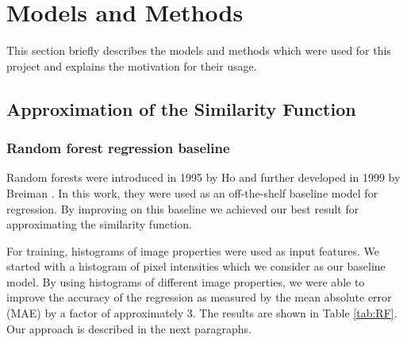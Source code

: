 \documentclass[10pt,conference,compsocconf]{IEEEtran}
\begin{document}


\section{Models and Methods} \label{sec:models_methods}
This section briefly describes the models and methods which were used for this project and explains the motivation for their usage. 

\subsection{Approximation of the Similarity Function}

\subsubsection{Random forest regression baseline} 
Random forests were introduced in 1995 by Ho \cite{Ho} and further developed in 1999 by Breiman \cite{Breiman}. In this work, they were used as an off-the-shelf baseline model for regression. By improving on this baseline we achieved our best result for approximating the similarity function. 

For training, histograms of image properties were used as input features. We started with a histogram of pixel intensities which we consider as our baseline model. By using histograms of different image properties, we were able to improve the accuracy of the regression as measured by the mean absolute error (MAE) by a factor of approximately 3. The results are shown in Table \ref{tab:RF}. Our approach is described in the next paragraphs.
\end{document}
